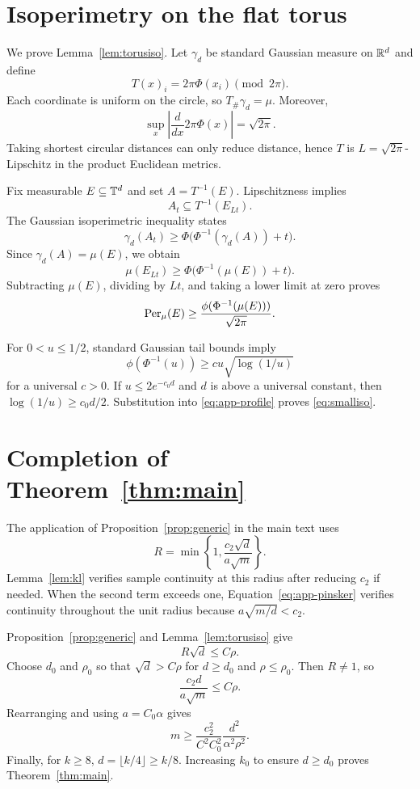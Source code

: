 \section{Isoperimetry on the flat torus}
\label{app:torus}

We prove Lemma~\ref{lem:torusiso}.
Let $\gamma_d$ be standard Gaussian measure on $\mathbb R^d$ and define
\[
 T(x)_i=2\pi\Phi(x_i)\pmod {2\pi}.
\]
Each coordinate is uniform on the circle, so $T_\#\gamma_d=\mu$.
Moreover,
\[
 \sup_x\left|\frac{d}{dx}2\pi\Phi(x)\right|
 =\sqrt{2\pi}.
\]
Taking shortest circular distances can only reduce distance, hence $T$ is $L=\sqrt{2\pi}$-Lipschitz in the product Euclidean metrics.

Fix measurable $E\subseteq\mathbb T^d$ and set $A=T^{-1}(E)$.
Lipschitzness implies
\[
 A_t\subseteq T^{-1}(E_{Lt}).
\]
The Gaussian isoperimetric inequality \citep{borell1975,sudakov1978} states
\[
 \gamma_d(A_t)\ge
 \Phi\big(\Phi^{-1}(\gamma_d(A))+t\big).
\]
Since $\gamma_d(A)=\mu(E)$, we obtain
\[
 \mu(E_{Lt})\ge
 \Phi\big(\Phi^{-1}(\mu(E))+t\big).
\]
Subtracting $\mu(E)$, dividing by $Lt$, and taking a lower limit at zero proves
\[
 \operatorname{Per}_\mu(E)\ge\frac{\phi(\Phi^{-1}(\mu(E)))}{\sqrt{2\pi}}.
\]

For $0<u\le1/2$, standard Gaussian tail bounds imply
\begin{equation}
 \phi(\Phi^{-1}(u))
 \ge c u\sqrt{\log(1/u)}
 \label{eq:app-profile}
\end{equation}
for a universal $c>0$.
If $u\le2e^{-c_0d}$ and $d$ is above a universal constant, then
$\log(1/u)\ge c_0d/2$.
Substitution into \eqref{eq:app-profile} proves \eqref{eq:smalliso}.

\section{Completion of Theorem~\ref{thm:main}}
\label{app:main}

The application of Proposition~\ref{prop:generic} in the main text uses
\[
 R=\min\left\{1,\frac{c_2\sqrt d}{a\sqrt m}\right\}.
\]
Lemma~\ref{lem:kl} verifies sample continuity at this radius after reducing $c_2$ if needed.
When the second term exceeds one, Equation~\eqref{eq:app-pinsker} verifies continuity throughout the unit radius because
$a\sqrt{m/d}<c_2$.

Proposition~\ref{prop:generic} and Lemma~\ref{lem:torusiso} give
\[
 R\sqrt d\le C\rho.
\]
Choose $d_0$ and $\rho_0$ so that $\sqrt d>C\rho$ for $d\ge d_0$ and $\rho\le\rho_0$.
Then $R\ne1$, so
\[
 \frac{c_2d}{a\sqrt m}\le C\rho.
\]
Rearranging and using $a=C_0\alpha$ gives
\[
 m\ge \frac{c_2^2}{C^2C_0^2}
       \frac{d^2}{\alpha^2\rho^2}.
\]
Finally, for $k\ge8$, $d=\lfloor k/4\rfloor\ge k/8$.
Increasing $k_0$ to ensure $d\ge d_0$ proves Theorem~\ref{thm:main}.
